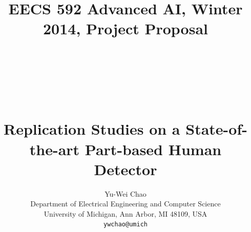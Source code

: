 \documentclass[10pt,twocolumn,letterpaper]{article}
\begin{document}
\title{{\vspace{-30mm}\small EECS 592 Advanced AI, Winter 2014, Project Proposal} \\
~\\
~\\
~\\
~\\
Replication Studies on a State-of-the-art Part-based Human Detector}

\author{Yu-Wei Chao\\
Department of Electrical Engineering and Computer Science \\
University of Michigan, Ann Arbor, MI 48109, USA\\
{\tt\small ywchao@umich}
}

\maketitle


%
%
%
%
%
%
%
%
%
%
%
\end{document}
